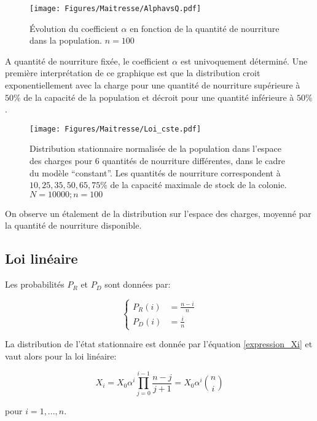 \begin{figure}[h]
\centering
\texttt{[image: Figures/Maitresse/AlphavsQ.pdf]}
\caption{Évolution du coefficient $\alpha$ en fonction de la quantité de nourriture dans la population. $n=100$}
\label{AlphavsQCste}
\end{figure}

A quantité de nourriture fixée, le coefficient $\alpha$ est univoquement déterminé. Une première interprétation de ce graphique est que la distribution croit exponentiellement avec la charge pour une quantité de nourriture supérieure à $50\%$ de la capacité de la population et décroit pour une quantité inférieure à $50\%$.



\begin{figure}[h]
\centering
\texttt{[image: Figures/Maitresse/Loi\_cste.pdf]}
\caption{Distribution stationnaire normalisée de la population dans l'espace des charges pour 6 quantités de nourriture différentes, dans le cadre du modèle ``constant''. Les quantités de nourriture correspondent à $10, 25, 35, 50, 65, 75\%$ de la capacité maximale de stock de la colonie. $N=10000; n=100$}
\label{DistribAnalytiqueCste}
\end{figure}

On observe un étalement de la distribution sur l'espace des charges, moyenné par la quantité de nourriture disponible.

\subsection{Loi linéaire}
Les probabilités $P_R$ et $P_D$ sont données par:

\begin{equation}
\left \{
\begin{aligned}
P_R(i) &= \frac{n-i}{n}\\
P_D(i) &= \frac{i}{n}
\end{aligned}
\right.
\end{equation}

La distribution de l'état stationnaire est donnée par l'équation \ref{expression_Xi} et vaut alors pour la loi linéaire:

\begin{equation}
X_i=X_0 \alpha^i \prod_{j=0}^{i-1} \frac{n-j}{j+1} =X_0 \alpha^i \binom{n}{i}
\end{equation}

pour $i=1,...,n$. \\

